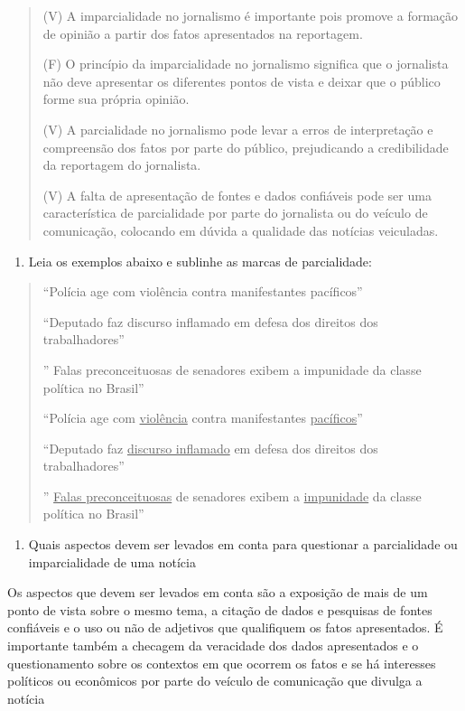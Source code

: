 {\begin{quote}
(V) A imparcialidade no jornalismo é importante pois promove a formação
de opinião a partir dos fatos apresentados na reportagem.

(F) O princípio da imparcialidade no jornalismo significa que o
jornalista não deve apresentar os diferentes pontos de vista e deixar
que o público forme sua própria opinião.

(V) A parcialidade no jornalismo pode levar a erros de interpretação e
compreensão dos fatos por parte do público, prejudicando a credibilidade
da reportagem do jornalista.

(V) A falta de apresentação de fontes e dados confiáveis pode ser uma
característica de parcialidade por parte do jornalista ou do veículo de
comunicação, colocando em dúvida a qualidade das notícias veiculadas.
\end{quote}

\begin{enumerate}
\def\labelenumi{\arabic{enumi})}
\setcounter{enumi}{6}
\tightlist
\item
  Leia os exemplos abaixo e sublinhe as marcas de parcialidade:
\end{enumerate}

\begin{quote}
``Polícia age com violência contra manifestantes pacíficos''

``Deputado faz discurso inflamado em defesa dos direitos dos
trabalhadores''

'' Falas preconceituosas de senadores exibem a impunidade da classe
política no Brasil''

``Polícia age com \uline{violência} contra manifestantes
\uline{pacíficos}''

``Deputado faz \uline{discurso inflamado} em defesa dos direitos dos
trabalhadores''

'' \uline{Falas preconceituosas} de senadores exibem a
\uline{impunidade} da classe política no Brasil''
\end{quote}

\begin{enumerate}
\def\labelenumi{\arabic{enumi})}
\setcounter{enumi}{7}
\tightlist
\item
  Quais aspectos devem ser levados em conta para questionar a
  parcialidade ou imparcialidade de uma notícia
\end{enumerate}

Os aspectos que devem ser levados em conta são a exposição de mais de um
ponto de vista sobre o mesmo tema, a citação de dados e pesquisas de
fontes confiáveis e o uso ou não de adjetivos que qualifiquem os fatos
apresentados. É importante também a checagem da veracidade dos dados
apresentados e o questionamento sobre os contextos em que ocorrem os
fatos e se há interesses políticos ou econômicos por parte do veículo de
comunicação que divulga a notícia

}
